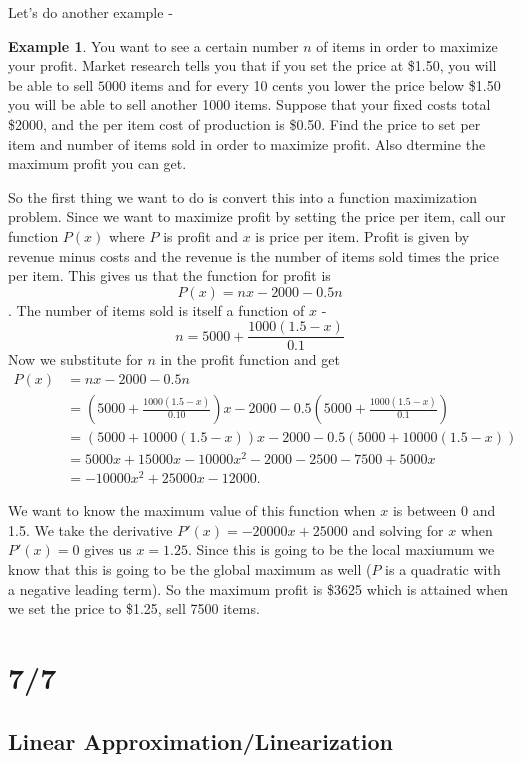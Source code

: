 \documentclass[12pt,reqno]{article}
\theoremstyle{definition}
\newtheorem*{Example}{Example}
\begin{document}
	Let's do another example - 
	\begin{Example}
		You want to see a certain number $n$ of items in order to maximize your profit. Market research tells you that if you set the price at \$1.50, you will be able to sell $5000$ items and for every 10 cents you lower the price below \$1.50 you will be able to sell another 1000 items. Suppose that your fixed costs total \$2000, and the per item cost of production is \$0.50. Find the price to set per item and number of items sold in order to maximize profit. Also dtermine the maximum profit you can get. 
		
		So the first thing we want to do is convert this into a function maximization problem. Since we want to maximize profit by setting the price per item, call our function $P(x)$ where $P$ is profit and $x$ is price per item. Profit is given by revenue minus costs and the revenue is the number of items sold times the price per item. This gives us that the function for profit is $$P(x) = nx - 2000 - 0.5n$$. The number of items sold is itself a function of $x$ - $$n = 5000 +\frac{1000 (1.5 - x)}{0.1}$$ Now we substitute for $n$ in the profit function and get 
		\begin{align*}
			P(x) &= nx - 2000 -0.5n \\
				 &= \left(5000 + \frac{1000(1.5 - x)}{0.10}\right)x - 2000 - 0.5\left(5000 + \frac{1000(1.5 - x)}{0.1}\right) \\
				 &= (5000 + 10000(1.5 - x))x - 2000 - 0.5(5000 + 10000(1.5 - x)) \\
				 &= 5000x + 15000x - 10000x^2 - 2000 - 2500 - 7500 + 5000x \\
				 &= -10000x^2 + 25000x - 12000.
		\end{align*}
		
		We want to know the maximum value of this function when $x$ is between 0 and 1.5. We take the derivative $P'(x) = -20000x + 25000$ and solving for $x$ when $P'(x) = 0$ gives us $x = 1.25$. Since this is going to be the local maxiumum we know that this is going to be the global maximum as well ($P$ is a quadratic with a negative leading term). So the maximum profit is \$3625 which is attained when we set the price to \$1.25, sell 7500 items. 
	\end{Example}
	
\section{7/7}

\subsection{Linear Approximation/Linearization}
\end{document}
